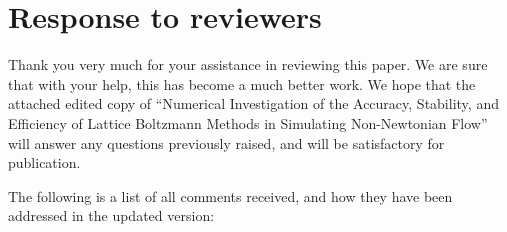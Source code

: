 \documentclass{article}
\begin{document}
	
	
\section*{Response to reviewers}

Thank you very much for your assistance in reviewing this paper. We are sure that with your help, this has become a much better work. We hope that the attached edited copy of ``Numerical Investigation of the Accuracy, Stability, and Efficiency of Lattice Boltzmann Methods in Simulating Non-Newtonian Flow'' will answer any questions previously raised, and will be satisfactory for publication.

The following is a list of all comments received, and how they have been addressed in the updated version:
\end{document}
